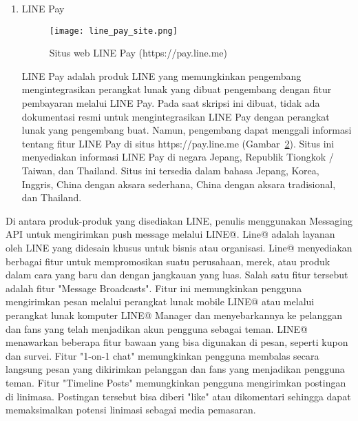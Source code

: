 \begin{enumerate}
\begin{figure}[H]
	\centering  
	\texttt{[image: clova\_site.png]}  
	\caption[Situs web Clova]{Situs web Clova (https://clova-developers.line.me)} 
	\label{fig:clova_site} 
\end{figure}

Clova adalah sebuah AI Assistant (perangkat lunak dengan kecerdasan buatan yang berfungsi sebagai asisten) yang dipasang di dalam Clova Wave dan Clova Friends. Clova masih dalam tahap pengembangan dan (pada saat skripsi ini dibuat) tersedia dalam versi beta. Tidak ada dokumentasi resmi untuk produk ini, namun disediakan situs web untuk menggali informasi tentang Clova : https://clova-developers.line.me (Gambar~\ref{fig:clova_site}). Pada saat skripsi ini ditulis, situs web ini hanya tersedia dalam bahasa Jepang sehingga membutuhkan penerjemah apabila tidak menguasai bahasa Jepang.

\item LINE Pay
\begin{figure}[H]
	\centering  
	\texttt{[image: line\_pay\_site.png]}  
	\caption[Situs web LINE Pay]{Situs web LINE Pay (https://pay.line.me)} 
	\label{fig:line_pay_site} 
\end{figure}

LINE Pay adalah produk LINE yang memungkinkan pengembang mengintegrasikan perangkat lunak yang dibuat pengembang dengan fitur pembayaran melalui LINE Pay. Pada saat skripsi ini dibuat, tidak ada dokumentasi resmi untuk mengintegrasikan LINE Pay dengan perangkat lunak yang pengembang buat. Namun, pengembang dapat menggali informasi tentang fitur LINE Pay di situs https://pay.line.me (Gambar~\ref{fig:line_pay_site}). Situs ini menyediakan informasi LINE Pay di negara Jepang, Republik Tiongkok / Taiwan, dan Thailand. Situs ini tersedia dalam bahasa Jepang, Korea, Inggris, China dengan aksara sederhana, China dengan aksara tradisional, dan Thailand.

\end{enumerate}

Di antara produk-produk yang disediakan LINE, penulis menggunakan Messaging API untuk mengirimkan push message melalui LINE@. Line@ adalah layanan oleh LINE yang didesain khusus untuk bisnis atau organisasi. Line@ menyediakan berbagai fitur untuk mempromosikan suatu perusahaan, merek, atau produk dalam cara yang baru dan dengan jangkauan yang luas. Salah satu fitur tersebut adalah fitur "Message Broadcasts". Fitur ini memungkinkan pengguna mengirimkan pesan melalui perangkat lunak mobile LINE@ atau melalui perangkat lunak komputer LINE@ Manager dan menyebarkannya ke pelanggan dan fans yang telah menjadikan akun pengguna sebagai teman. LINE@ menawarkan beberapa fitur bawaan yang bisa digunakan di pesan, seperti kupon dan survei. Fitur "1-on-1 chat" memungkinkan pengguna membalas secara langsung pesan yang dikirimkan pelanggan dan fans yang menjadikan pengguna teman. Fitur "Timeline Posts" memungkinkan pengguna mengirimkan postingan di linimasa. Postingan tersebut bisa diberi "like" atau dikomentari sehingga dapat memaksimalkan potensi linimasi sebagai media pemasaran.

